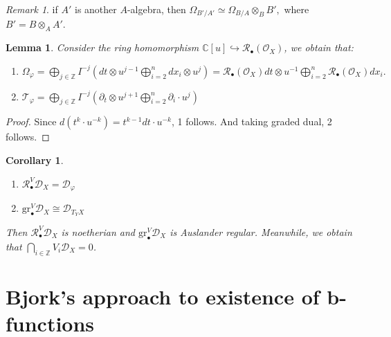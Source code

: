 \documentclass[openany]{book}
\newtheorem{lemma}[theorem]{Lemma}     %
\newtheorem{corollary}[theorem]{Corollary}   %
\theoremstyle{definition} %
\theoremstyle{remark}
\newtheorem{remark}{Remark}[chapter] %
\begin{document}
\begin{remark}
    if $A'$ is another $A$-algebra, then $\Omega_{B'/A'} \simeq \Omega_{B/A} \otimes_B B',$ where $B' = B \otimes_A A'$.
\end{remark}

\begin{lemma}

    Consider the ring homomorphism $\mathbb{C}[u]\hookrightarrow \mathcal{R}_\bullet(\mathcal{O}_X)$, we obtain that:

    \begin{enumerate}
        \item $\Omega_\varphi = \bigoplus_{j \in \mathbb{Z}} I^{-j} (dt \otimes u^{j-1}  \bigoplus\limits_{i=2}^{n} dx_{i} \otimes u^{j}) = \mathcal{R}_{\bullet}(\mathcal{O}_X) dt \otimes u^{-1}  \bigoplus\limits_{i=2}^{n} \mathcal{R}_{\bullet}(\mathcal{O}_X) dx_{i}.$
        \item $\mathcal{T}_\varphi = \bigoplus\limits_{j \in \mathbb{Z}} I^{-j} (\partial_t \otimes u^{j+1} \bigoplus_{i=2}^n \partial_i \cdot u^j)$
    \end{enumerate}
\end{lemma}
\begin{proof}
    Since $d(t^k \cdot u^{-k}) = t^{k-1} dt \cdot u^{-k}$, 1 follows. And taking graded dual, 2 follows.
\end{proof}

\begin{corollary}
    \quad
    \begin{enumerate}
        \item $\mathcal{R}_{\bullet}^V \mathcal{D}_X = \mathcal{D}_\varphi$
        \item  $\mathrm{gr}_{\bullet}^V \mathcal{D}_X \cong \mathcal{D}_{T_Y X}$
    \end{enumerate}
    Then $\mathcal{R}^V_{\bullet} \mathcal{D}_X$ is noetherian and  $\mathrm{gr}^{V}_{\bullet} \mathcal{D}_X$ is Auslander regular. Meanwhile, we obtain that $\bigcap\limits_{i \in \mathbb{Z}} V_i \mathcal{D}_X = 0$.

\end{corollary}

\section{Bjork’s approach to existence of b-functions}
\end{document}
